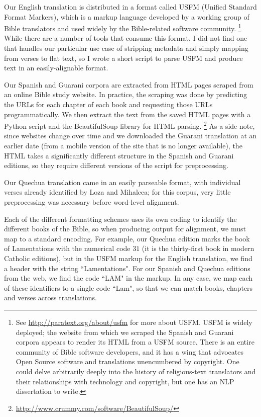 Our English translation is distributed in a format called USFM (Unified
Standard Format Markers), which is a markup language developed by a working
group of Bible translators and used widely by the Bible-related software
community.
\footnote{See \url{http://paratext.org/about/usfm} for more about USFM. USFM is
widely deployed; the website from which we scraped the Spanish and Guarani
corpora appears to render its HTML from a USFM source.  There is an entire
community of Bible software developers, and it has a wing that advocates Open
Source software and translations unencumbered by copyright.  One could delve
arbitrarily deeply into the history of religious-text translators and their
relationships with technology and copyright, but one has an NLP dissertation to
write.}
While there are a number of tools that consume this format, I did not find one
that handles our particular use case of stripping metadata and simply mapping
from verses to flat text, so I wrote a short script to parse USFM and produce
text in an easily-alignable format.

Our Spanish and Guarani corpora are extracted from HTML pages scraped from an
online Bible study website. In practice, the scraping was done by predicting
the URLs for each chapter of each book and requesting those URLs
programmatically. We then extract the text from the saved HTML pages with a
Python script and the BeautifulSoup library for HTML parsing.
\footnote{\url{http://www.crummy.com/software/BeautifulSoup/}}
As a side note, since websites change over time and we
downloaded the Guarani translation at an earlier date (from a mobile version of
the site that is no longer available), the HTML takes a significantly different
structure in the Spanish and Guarani editions, so they require different
versions of the script for preprocessing.

Our Quechua translation came in an easily parseable format, with individual
verses already identified by Loza and Mihalcea; for this corpus, very little
preprocessing was necessary before word-level alignment.

Each of the different formatting schemes uses its own coding to identify the
different books of the Bible, so when producing output for alignment, we must
map to a standard encoding. For example, our Quechua edition marks the book of
Lamentations with the numerical code $31$ (it is the thirty-first book in
modern Catholic editions), but in the USFM markup for the English translation,
we find a header with the string ``Lamentations". For our Spanish and Quechua
editions from the web, we find the code ``LAM" in the markup. In any case, we
map each of these identifiers to a single code ``Lam", so that we can match
books, chapters and verses across translations.

